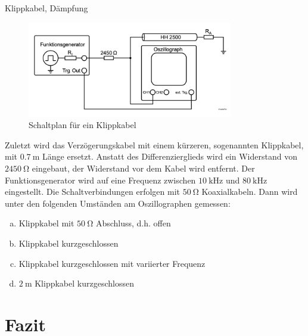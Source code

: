 \documentclass[ngerman]{scrartcl}
\theoremstyle{definition}
\begin{document}
		\begin{aufgabe}{Klippkabel, Dämpfung}
			\begin{figure}[h!]
				\centering
				\includegraphics[width=0.8\textwidth]{Aufbau_1_4_Klippkabel.png}
				\caption{Schaltplan für ein Klippkabel \cite{anleitung}}
				\label{fig:aufbau_1_4_klippkabel}
			\end{figure}
			Zuletzt wird das Verzögerungskabel mit einem kürzeren, sogenannten Klippkabel, mit $\SI{0.7}{\meter}$ Länge ersetzt. Anstatt des Differenzierglieds wird ein Widerstand von $\SI{2450}{\ohm}$ eingebaut, der Widerstand vor dem Kabel wird entfernt. Der Funktionsgenerator wird auf eine Frequenz zwischen $\SI{10}{\kilo\hertz}$ und $\SI{80}{\kilo\hertz}$ eingestellt. Die Schaltverbindungen erfolgen mit $\SI{50}{\ohm}$ Koaxialkabeln. Dann wird unter den folgenden Umständen am Oszillographen gemessen:
			\begin{enumerate}[(a)]
				\item Klippkabel mit $\SI{50}{\ohm}$ Abschluss, d.h. offen
				\item Klippkabel kurzgeschlossen
				\item Klippkabel kurzgeschlossen mit variierter Frequenz
				\item $\SI{2}{\meter}$ Klippkabel kurzgeschlossen 
			\end{enumerate}
		\end{aufgabe}
		

	\section{Fazit}
	\printbibliography
\end{document}
